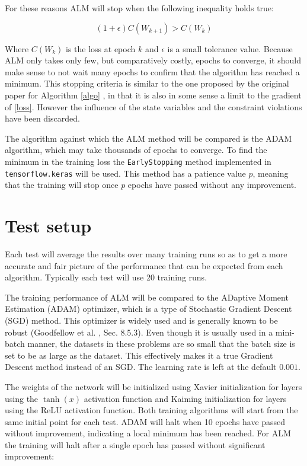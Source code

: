 For these reasons ALM will stop when the following inequality holds true:

\begin{equation}
(1+\epsilon)C(W_{k+1}) > C(W_k)
\end{equation}

Where $C(W_k)$ is the loss at epoch $k$ and $\epsilon$ is a small tolerance value. Because ALM only takes only few, but comparatively costly, epochs to converge, it should make sense to not wait many epochs to confirm that the algorithm has reached a minimum. This stopping criteria is similar to the one proposed by the original paper for Algorithm \ref{algo} \cite{sahin2019}, in that it is also in some sense a limit to the gradient of \ref{loss}. However the influence of the state variables and the constraint violations have been discarded.

The algorithm against which the ALM method will be compared is the ADAM algorithm, which may take thousands of epochs to converge. To find the minimum in the training loss the \texttt{EarlyStopping} method implemented in \texttt{tensorflow.keras} will be used. This method has a patience value $p$, meaning that the training will stop once $p$ epochs have passed without any improvement.
 

\section{Test setup}
Each test will average the results over many training runs so as to get a more accurate and fair picture of the performance that can be expected from each algorithm. Typically each test will use 20 training runs.

The training performance of ALM will be compared to the ADaptive Moment Estimation (ADAM) optimizer, which is a type of Stochastic Gradient Descent (SGD) method. This optimizer is widely used and is generally known to be robust (Goodfellow et al. \cite{Goodfellow-et-al-2016}, Sec. 8.5.3). Even though it is usually used in a mini-batch manner, the datasets in these problems are so small that the batch size is set to be as large as the dataset. This effectively makes it a true Gradient Descent method instead of an SGD. The learning rate is left at the default $0.001$. 

The weights of the network will be initialized using Xavier initialization for layers using the $\tanh(x)$ activation function and Kaiming initialization for layers using the ReLU activation function. Both training algorithms will start from the same initial point for each test. ADAM will halt when 10 epochs have passed without improvement, indicating a local minimum has been reached. For ALM the training will halt after a single epoch has passed without significant improvement:

